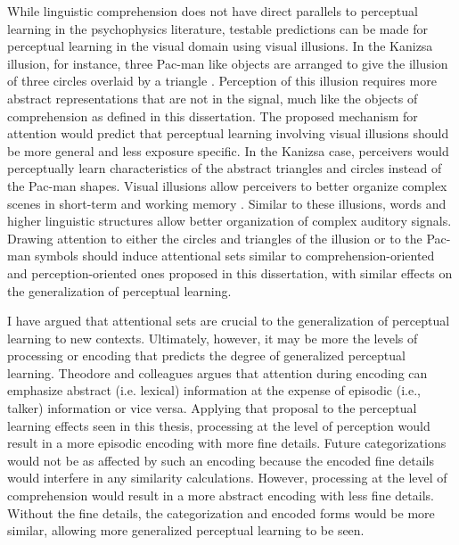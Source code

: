 While linguistic comprehension does not have direct parallels to perceptual learning in the psychophysics literature, testable predictions can be made for perceptual learning in the visual domain using visual illusions.
In the Kanizsa illusion, for instance, three Pac-man like objects are arranged to give the illusion of three circles overlaid by a triangle \citep{Kanizsa1976}.
Perception of this illusion requires more abstract representations that are not in the signal, much like the objects of comprehension as defined in this dissertation.
The proposed mechanism for attention would predict that perceptual learning involving visual illusions should be more general and less exposure specific.
In the Kanizsa case, perceivers would perceptually learn characteristics of the abstract triangles and circles instead of the Pac-man shapes.
Visual illusions allow perceivers to better organize complex scenes in short-term and working memory \citep{Vandenbroucke2012}.
Similar to these illusions, words and higher linguistic structures allow better organization of complex auditory signals.
Drawing attention to either the circles and triangles of the illusion or to the Pac-man symbols should induce attentional sets similar to comprehension-oriented and perception-oriented ones proposed in this dissertation, with similar effects on the generalization of perceptual learning.

I have argued that attentional sets are crucial to the generalization of perceptual learning to new contexts.
Ultimately, however, it may be more the levels of processing \citep{Cutler1987} or encoding \citep{Theodore2015} that predicts the degree of generalized perceptual learning.
Theodore and colleagues argues that attention during encoding can emphasize abstract (i.e. lexical) information at the expense of episodic (i.e., talker) information or vice versa.
Applying that proposal to the perceptual learning effects seen in this thesis, processing at the level of perception would result in a more episodic encoding with more fine details.
Future categorizations would not be as affected by such an encoding because the encoded fine details would interfere in any similarity calculations.
However, processing at the level of comprehension would result in a more abstract encoding with less fine details.
Without the fine details, the categorization and encoded forms would be more similar, allowing more generalized perceptual learning to be seen.



